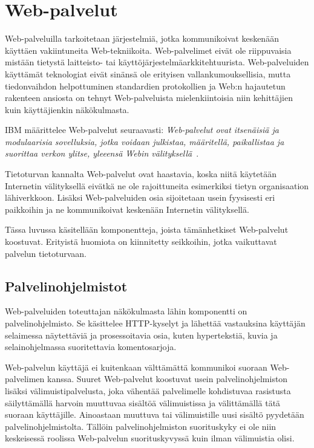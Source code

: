 
\chapter{Web-palvelut}

Web-palveluilla tarkoitetaan järjestelmiä, jotka kommunikoivat
keskenään käyttäen vakiintuneita Web-tekniikoita. Web-palvelimet eivät
ole riippuvaisia mistään tietystä laitteisto- tai
käyttöjärjestelmäarkkitehtuurista. Web-palveluiden käyttämät
teknologiat eivät sinänsä ole erityisen vallankumouksellisia, mutta
tiedonvaihdon helpottuminen standardien protokollien ja Web:n
hajautetun rakenteen ansiosta on tehnyt Web-palveluista
mielenkiintoisia niin kehittäjien kuin käyttäjienkin
näkökulmasta\cite{javaweb}.

IBM määrittelee Web-palvelut seuraavasti: \textit{Web-palvelut ovat
itsenäisiä ja modulaarisia sovelluksia, jotka voidaan julkistaa,
määritellä, paikallistaa ja suorittaa verkon ylitse, yleeensä Webin
välityksellä}~\cite{websecurity}.

Tietoturvan kannalta Web-palvelut ovat haastavia, koska niitä
käytetään Internetin välityksellä eivätkä ne ole rajoittuneita
esimerkiksi tietyn organisaation lähiverkkoon.
Lisäksi Web-palveluiden osia sijoitetaan usein fyysisesti eri paikkoihin ja ne
kommunikoivat keskenään Internetin välityksellä.

Tässa luvussa käsitellään komponentteja, joista tämänhetkiset
Web-palvelut koostuvat. Erityistä huomiota on kiinnitetty seikkoihin,
jotka vaikuttavat palvelun tietoturvaan.

\section{Palvelinohjelmistot}

Web-palveluiden toteuttajan näkökulmasta lähin komponentti on
palvelinohjelmisto. Se käsittelee HTTP-kyselyt ja lähettää vastauksina
käyttäjän selaimessa näytettäviä ja prosessoitavia osia, kuten
hypertekstiä, kuvia ja selainohjelmassa suoritettavia komentosarjoja.

Web-palvelun käyttäjä ei kuitenkaan välttämättä kommunikoi suoraan
Web-pal\-ve\-li\-men kanssa. Suuret Web-palvelut koostuvat usein
palvelinohjelmiston lisäksi välimuistipalvelusta, joka vähentää
palvelimelle kohdistuvaa rasistusta säilyttämällä harvoin muuttuvaa
sisältöä välimuistissa ja välittämällä tätä suoraan
käyttäjille. Ainoastaan muuttuva tai välimuistille uusi sisältö pyydetään
palvelinohjelmistolta. Tällöin palvelinohjelmiston suorituskyky ei ole
niin keskeisessä roolissa Web-palvelun suorituskyvyssä kuin ilman
välimuistia olisi. %

